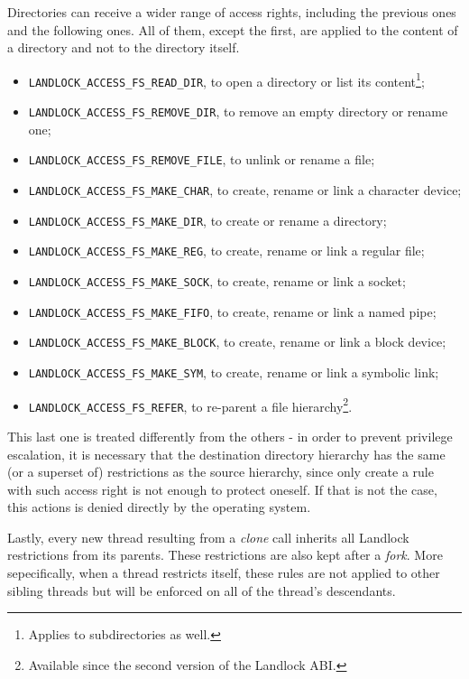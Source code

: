 Directories can receive a wider range of access rights, including the previous ones and the following ones.
All of them, except the first, are applied to the content of a directory and not to the directory itself.
\begin{itemize}
  \item \texttt{LANDLOCK\_ACCESS\_FS\_READ\_DIR}, to open a directory or list its content\footnote{Applies to subdirectories as well.};
  \item \texttt{LANDLOCK\_ACCESS\_FS\_REMOVE\_DIR}, to remove an empty directory or rename one;
  \item \texttt{LANDLOCK\_ACCESS\_FS\_REMOVE\_FILE}, to unlink or rename a file;
  \item \texttt{LANDLOCK\_ACCESS\_FS\_MAKE\_CHAR}, to create, rename or link a character device;
  \item \texttt{LANDLOCK\_ACCESS\_FS\_MAKE\_DIR}, to create or rename a directory;
  \item \texttt{LANDLOCK\_ACCESS\_FS\_MAKE\_REG}, to create, rename or link a regular file;
  \item \texttt{LANDLOCK\_ACCESS\_FS\_MAKE\_SOCK}, to create, rename or link a socket;
  \item \texttt{LANDLOCK\_ACCESS\_FS\_MAKE\_FIFO}, to create, rename or link a named pipe;
  \item \texttt{LANDLOCK\_ACCESS\_FS\_MAKE\_BLOCK}, to create, rename or link a block device;
  \item \texttt{LANDLOCK\_ACCESS\_FS\_MAKE\_SYM}, to create, rename or link a symbolic link;
  \item \texttt{LANDLOCK\_ACCESS\_FS\_REFER}, to re-parent a file hierarchy\footnote{Available since the second version of the Landlock ABI.}.
\end{itemize}

This last one is treated differently from the others - in order to prevent privilege escalation,
it is necessary that the destination directory hierarchy has the same (or a superset of) restrictions
as the source hierarchy, since only create a rule with such access right is not enough to protect oneself.
If that is not the case, this actions is denied directly by the operating system.

Lastly, every new thread resulting from a \textit{clone} call inherits all Landlock restrictions from its parents.
These restrictions are also kept after a \textit{fork}.
More sepecifically, when a thread restricts itself, these rules are not applied to other sibling threads
but will be enforced on all of the thread's descendants.

